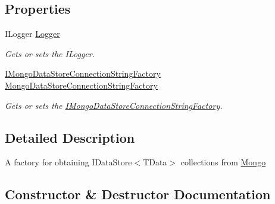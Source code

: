 \subsection*{Properties}
\begin{DoxyCompactItemize}
\item 
I\+Logger \hyperlink{classCqrs_1_1Mongo_1_1Factories_1_1MongoDataStoreFactory_a52df9c093f6c5a5666b27833334b48dc_a52df9c093f6c5a5666b27833334b48dc}{Logger}
\begin{DoxyCompactList}\small\item\em Gets or sets the I\+Logger. \end{DoxyCompactList}\item 
\hyperlink{interfaceCqrs_1_1Mongo_1_1Factories_1_1IMongoDataStoreConnectionStringFactory}{I\+Mongo\+Data\+Store\+Connection\+String\+Factory} \hyperlink{classCqrs_1_1Mongo_1_1Factories_1_1MongoDataStoreFactory_a2a93f0c1223ac3eaf3228307ee2849e8_a2a93f0c1223ac3eaf3228307ee2849e8}{Mongo\+Data\+Store\+Connection\+String\+Factory}
\begin{DoxyCompactList}\small\item\em Gets or sets the \hyperlink{interfaceCqrs_1_1Mongo_1_1Factories_1_1IMongoDataStoreConnectionStringFactory}{I\+Mongo\+Data\+Store\+Connection\+String\+Factory}. \end{DoxyCompactList}\end{DoxyCompactItemize}


\subsection{Detailed Description}
A factory for obtaining I\+Data\+Store$<$\+T\+Data$>$ collections from \hyperlink{namespaceCqrs_1_1Mongo}{Mongo} 



\subsection{Constructor \& Destructor Documentation}
\mbox{\label{classCqrs_1_1Mongo_1_1Factories_1_1MongoDataStoreFactory_a13e1957d50ef5ebb18723a3628a0ae5d_a13e1957d50ef5ebb18723a3628a0ae5d}} 
